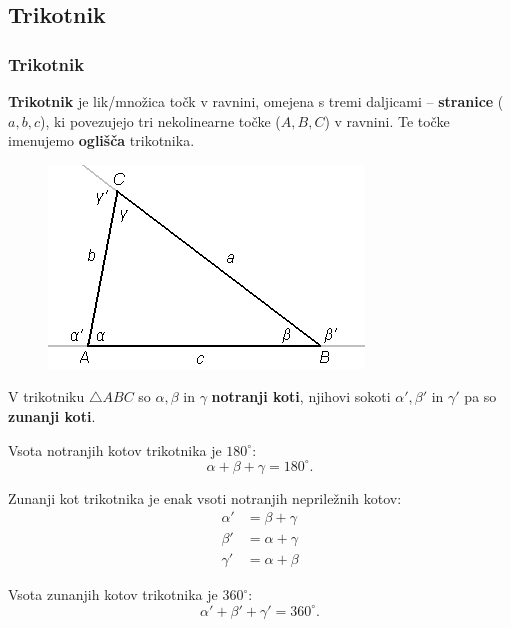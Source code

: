     \subsection{Trikotnik}

        \begin{frame}
            \frametitle{Trikotnik}

            \begin{alertblock}{}
                \textbf{Trikotnik} je lik/množica točk v ravnini, omejena s tremi daljicami -- \textbf{stranice} ($a, b, c$), ki povezujejo tri nekolinearne točke ($A, B, C$) v ravnini. Te točke imenujemo \textbf{oglišča} trikotnika.
            \end{alertblock}
            
            \begin{figure}
                \includegraphics[scale=0.7]{Slike in skice/Trikotnik.png}    
            \end{figure}

            V trikotniku $\triangle ABC$  so $\alpha, \beta$ in $\gamma$ \textbf{notranji koti}, njihovi sokoti $\alpha', \beta'$ in $\gamma'$ pa so \textbf{zunanji koti}. 
            
        \end{frame}

        \begin{frame}
            
            \begin{alertblock}{}
                Vsota notranjih kotov trikotnika je $180^\circ$: $$\alpha+\beta+\gamma=180^\circ.$$ 
            \end{alertblock}

            \begin{alertblock}{}
                Zunanji kot trikotnika je enak vsoti notranjih nepriležnih kotov: 
                \begin{align*}
                    \alpha' &= \beta+\gamma \\
                    \beta' &= \alpha+\gamma \\
                    \gamma' &= \alpha+\beta
                \end{align*}
            \end{alertblock}

            \begin{alertblock}{}
                Vsota zunanjih kotov trikotnika je $360^\circ$: $$\alpha'+\beta'+\gamma'=360^\circ.$$ 
            \end{alertblock}

        \end{frame}


